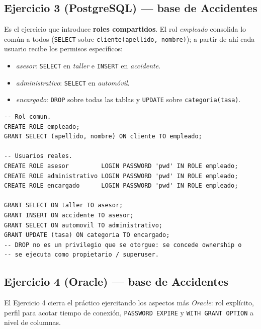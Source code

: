\documentclass[11pt,a4paper]{article}
\begin{document}
\subsection*{Ejercicio 3 (PostgreSQL) --- base de Accidentes}

Es el ejercicio que introduce \textbf{roles compartidos}. El rol
\emph{empleado} consolida lo común a todos (\texttt{SELECT} sobre
\texttt{cliente(apellido, nombre)}); a partir de ahí cada usuario
recibe los permisos específicos:

\begin{itemize}
    \item \emph{asesor}: \texttt{SELECT} en \emph{taller} e
    \texttt{INSERT} en \emph{accidente}.
    \item \emph{administrativo}: \texttt{SELECT} en \emph{automóvil}.
    \item \emph{encargado}: \texttt{DROP} sobre todas las tablas y
    \texttt{UPDATE} sobre \texttt{categoria(tasa)}.
\end{itemize}

\begin{lstlisting}
-- Rol comun.
CREATE ROLE empleado;
GRANT SELECT (apellido, nombre) ON cliente TO empleado;

-- Usuarios reales.
CREATE ROLE asesor         LOGIN PASSWORD 'pwd' IN ROLE empleado;
CREATE ROLE administrativo LOGIN PASSWORD 'pwd' IN ROLE empleado;
CREATE ROLE encargado      LOGIN PASSWORD 'pwd' IN ROLE empleado;

GRANT SELECT ON taller TO asesor;
GRANT INSERT ON accidente TO asesor;
GRANT SELECT ON automovil TO administrativo;
GRANT UPDATE (tasa) ON categoria TO encargado;
-- DROP no es un privilegio que se otorgue: se concede ownership o
-- se ejecuta como propietario / superuser.
\end{lstlisting}

\subsection*{Ejercicio 4 (Oracle) --- base de Accidentes}

El Ejercicio 4 cierra el práctico ejercitando los aspectos más
\emph{Oracle}: rol explícito, perfil para acotar tiempo de conexión,
\texttt{PASSWORD EXPIRE} y \texttt{WITH GRANT OPTION} a nivel de
columnas.
\end{document}

